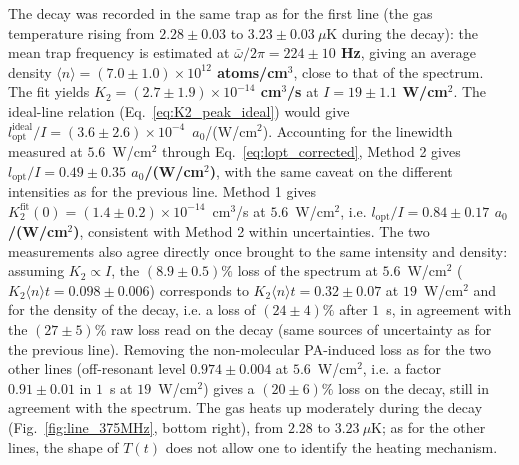 The decay was recorded in the same trap as for the first line (the gas temperature rising
from $2.28\pm0.03$ to $3.23\pm0.03~\mu$K during the decay): the mean trap
frequency is estimated at \textbf{$\bar\omega/2\pi = 224\pm10$ Hz}, giving an average
density \textbf{$\langle n\rangle = (7.0\pm1.0)\times10^{12}$ atoms/cm$^3$}, close to that of
the spectrum. The fit yields
\textbf{$K_2 = (2.7\pm1.9)\times10^{-14}$ cm$^3$/s} at \textbf{$I=19\pm1.1$ W/cm$^2$}. The
ideal-line relation (Eq.~\ref{eq:K2_peak_ideal}) would give
$l_{\text{opt}}^{\text{ideal}}/I=(3.6\pm2.6)\times10^{-4}$~$a_0$/(W/cm$^2$).
Accounting for the linewidth measured at $5.6$~W/cm$^2$ through
Eq.~\ref{eq:lopt_corrected}, Method 2 gives
\textbf{$l_{\text{opt}}/I=0.49\pm0.35$ $a_0$/(W/cm$^2$)}, with the same caveat on the
different intensities as for the previous line. Method 1 gives
$K_2^{\text{fit}}(0) = (1.4\pm0.2)\times10^{-14}$~cm$^3$/s at $5.6$~W/cm$^2$, i.e.
\textbf{$l_{\text{opt}}/I=0.84\pm0.17$ $a_0$/(W/cm$^2$)}, consistent with Method 2 within
uncertainties. The two measurements also agree directly once brought to the same
intensity and density: assuming $K_2\propto I$, the $(8.9\pm0.5)\%$ loss of the spectrum
at $5.6$~W/cm$^2$ ($K_2\langle n\rangle t=0.098\pm0.006$) corresponds to
$K_2\langle n\rangle t=0.32\pm0.07$ at $19$~W/cm$^2$ and for the density of the decay,
i.e. a loss of $(24\pm4)\%$ after
$1$~s, in agreement with the $(27\pm5)\%$ raw loss read on the decay (same sources of
uncertainty as for the previous line). Removing the non-molecular PA-induced loss as for
the two other lines (off-resonant level $0.974\pm0.004$ at $5.6$~W/cm$^2$, i.e. a factor
$0.91\pm0.01$ in $1$~s at $19$~W/cm$^2$) gives a $(20\pm6)\%$ loss on the decay, still in
agreement with the spectrum. The
gas heats up moderately during the decay (Fig.~\ref{fig:line_375MHz}, bottom right), from
$2.28$ to $3.23~\mu$K; as for the other lines, the shape of $T(t)$ does not allow one to
identify the heating mechanism.


